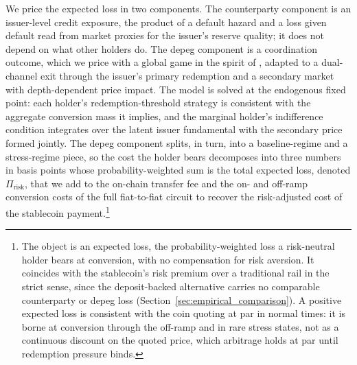 We price the expected loss in two components. The counterparty component is an issuer-level credit exposure, the product of a default hazard and a loss given default read from market proxies for the issuer's reserve quality; it does not depend on what other holders do. The depeg component is a coordination outcome, which we price with a global game in the spirit of \citet{morris_shin_1998}, adapted to a dual-channel exit through the issuer's primary redemption and a secondary market with depth-dependent price impact. The model is solved at the endogenous fixed point: each holder's redemption-threshold strategy is consistent with the aggregate conversion mass it implies, and the marginal holder's indifference condition integrates over the latent issuer fundamental with the secondary price formed jointly. The depeg component splits, in turn, into a baseline-regime and a stress-regime piece, so the cost the holder bears decomposes into three numbers in basis points whose probability-weighted sum is the total expected loss, denoted $\Pi_{\text{risk}}$, that we add to the on-chain transfer fee and the on- and off-ramp conversion costs of the full fiat-to-fiat circuit to recover the risk-adjusted cost of the stablecoin payment.\footnote{The object is an expected loss, the probability-weighted loss a risk-neutral holder bears at conversion, with no compensation for risk aversion. It coincides with the stablecoin's risk premium over a traditional rail in the strict sense, since the deposit-backed alternative carries no comparable counterparty or depeg loss (Section~\ref{sec:empirical_comparison}). A positive expected loss is consistent with the coin quoting at par in normal times: it is borne at conversion through the off-ramp and in rare stress states, not as a continuous discount on the quoted price, which arbitrage holds at par until redemption pressure binds.}

